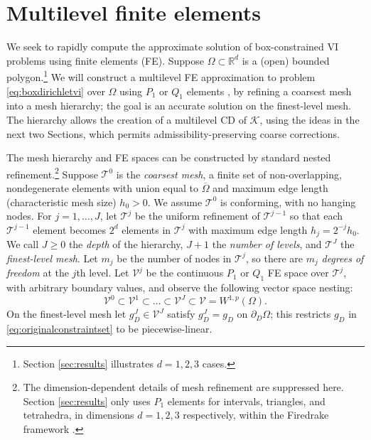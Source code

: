 \documentclass[letterpaper,final,12pt,reqno]{amsart}
\theoremstyle{cstyle}
\theoremstyle{cstyle*}
\theoremstyle{dstyle}
\numberwithin{equation}{section}
\numberwithin{figure}{section}
\numberwithin{table}{section}
\numberwithin{theorem}{section}
\newcommand{\RR}{\mathbb{R}}
\newcommand{\cK}{\mathcal{K}}
\begin{document}
\section{Multilevel finite elements} \label{sec:femultilevel}

We seek to rapidly compute the approximate solution of box-constrained VI problems using finite elements (FE).  Suppose $\Omega \subset \RR^d$ is a (open) bounded polygon.\footnote{Section \ref{sec:results} illustrates $d=1,2,3$ cases.}  We will construct a multilevel FE approximation to problem \eqref{eq:boxdirichletvi} over $\Omega$ using $P_1$ or $Q_1$ elements \cite{Elmanetal2014}, by refining a coarsest mesh into a mesh hierarchy; the goal is an accurate solution on the finest-level mesh.  The hierarchy allows the creation of a multilevel CD of $\cK$, using the ideas in the next two Sections, which permits admissibility-preserving coarse corrections.

The mesh hierarchy and FE spaces can be constructed by standard nested refinement.\footnote{The dimension-dependent details of mesh refinement are suppressed here.  Section \ref{sec:results} only uses $P_1$ elements for intervals, triangles, and tetrahedra, in dimensions $d=1,2,3$ respectively, within the Firedrake framework \cite{Rathgeberetal2016}.}  Suppose $\mathcal{T}^0$ is the \emph{coarsest mesh}, a finite set of non-overlapping, nondegenerate elements with union equal to $\overline{\Omega}$ and maximum edge length (characteristic mesh size) $h_0>0$.  We assume $\mathcal{T}^0$ is conforming, with no hanging nodes.  For $j=1,\dots,J$, let $\mathcal{T}^j$ be the uniform refinement of $\mathcal{T}^{j-1}$ so that each $\mathcal{T}^{j-1}$ element becomes $2^d$ elements in $\mathcal{T}^j$ with maximum edge length $h_j = 2^{-j} h_0$.  We call $J\ge 0$ the \emph{depth} of the hierarchy, $J+1$ the \emph{number of levels}, and $\mathcal{T}^J$ the \emph{finest-level mesh}.  Let $m_j$ be the number of nodes in $\mathcal{T}^j$, so there are $m_j$ \emph{degrees of freedom} at the $j$th level.  Let $\mathcal{V}^j$ be the continuous $P_1$ or $Q_1$ FE space over $\mathcal{T}^j$, with arbitrary boundary values, and observe the following vector space nesting:
\begin{equation}
\mathcal{V}^0 \subset \mathcal{V}^1 \subset \dots \subset \mathcal{V}^J \subset \mathcal{V}=W^{1,p}(\Omega).  \label{eq:fe:nestedspaces}
\end{equation}
On the finest-level mesh let $g_D^J \in \mathcal{V}^J$ satisfy $g_D^J = g_D$ on $\partial_D \Omega$; this restricts $g_D$ in \eqref{eq:originalconstraintset} to be piecewise-linear.
\end{document}
